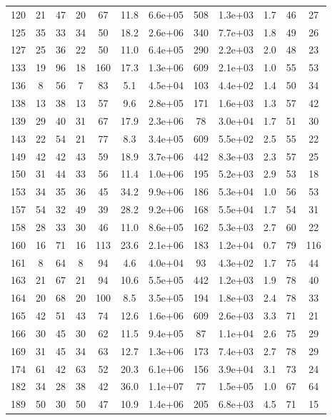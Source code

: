 \begin{table}
\begin{tabular}{cccccccccccc}
120 & 21 & 47 & 20 & 67 & 11.8 & 6.6e+05 & 508 & 1.3e+03 & 1.7 & 46 & 27 \\
125 & 35 & 33 & 34 & 50 & 18.2 & 2.6e+06 & 340 & 7.7e+03 & 1.8 & 49 & 26 \\
127 & 25 & 36 & 22 & 50 & 11.0 & 6.4e+05 & 290 & 2.2e+03 & 2.0 & 48 & 23 \\
133 & 19 & 96 & 18 & 160 & 17.3 & 1.3e+06 & 609 & 2.1e+03 & 1.0 & 55 & 53 \\
136 & 8 & 56 & 7 & 83 & 5.1 & 4.5e+04 & 103 & 4.4e+02 & 1.4 & 50 & 34 \\
138 & 13 & 38 & 13 & 57 & 9.6 & 2.8e+05 & 171 & 1.6e+03 & 1.3 & 57 & 42 \\
139 & 29 & 40 & 31 & 67 & 17.9 & 2.3e+06 & 78 & 3.0e+04 & 1.7 & 51 & 30 \\
143 & 22 & 54 & 21 & 77 & 8.3 & 3.4e+05 & 609 & 5.5e+02 & 2.5 & 55 & 22 \\
149 & 42 & 42 & 43 & 59 & 18.9 & 3.7e+06 & 442 & 8.3e+03 & 2.3 & 57 & 25 \\
150 & 31 & 44 & 33 & 56 & 11.4 & 1.0e+06 & 195 & 5.2e+03 & 2.9 & 53 & 18 \\
153 & 34 & 35 & 36 & 45 & 34.2 & 9.9e+06 & 186 & 5.3e+04 & 1.0 & 56 & 53 \\
157 & 54 & 32 & 49 & 39 & 28.2 & 9.2e+06 & 168 & 5.5e+04 & 1.7 & 54 & 31 \\
158 & 28 & 33 & 30 & 46 & 11.0 & 8.6e+05 & 162 & 5.3e+03 & 2.7 & 60 & 22 \\
160 & 16 & 71 & 16 & 113 & 23.6 & 2.1e+06 & 183 & 1.2e+04 & 0.7 & 79 & 116 \\
161 & 8 & 64 & 8 & 94 & 4.6 & 4.0e+04 & 93 & 4.3e+02 & 1.7 & 75 & 44 \\
163 & 21 & 67 & 21 & 94 & 10.6 & 5.5e+05 & 442 & 1.2e+03 & 1.9 & 78 & 40 \\
164 & 20 & 68 & 20 & 100 & 8.5 & 3.5e+05 & 194 & 1.8e+03 & 2.4 & 78 & 33 \\
165 & 42 & 51 & 43 & 74 & 12.6 & 1.6e+06 & 609 & 2.6e+03 & 3.3 & 71 & 21 \\
166 & 30 & 45 & 30 & 62 & 11.5 & 9.4e+05 & 87 & 1.1e+04 & 2.6 & 75 & 29 \\
169 & 31 & 45 & 34 & 63 & 12.7 & 1.3e+06 & 173 & 7.4e+03 & 2.7 & 78 & 29 \\
174 & 61 & 42 & 63 & 52 & 20.3 & 6.1e+06 & 156 & 3.9e+04 & 3.1 & 73 & 24 \\
182 & 34 & 28 & 38 & 42 & 36.0 & 1.1e+07 & 77 & 1.5e+05 & 1.0 & 67 & 64 \\
189 & 50 & 30 & 50 & 47 & 10.9 & 1.4e+06 & 205 & 6.8e+03 & 4.5 & 71 & 15 \\

\end{tabular}
\end{table}
